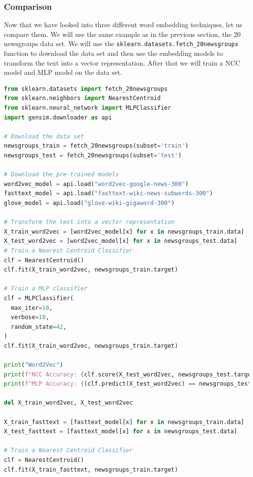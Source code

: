 \subsubsection{Comparison}
Now that we have looked into three different word embedding techniques, let us compare them.
We will use the same example as in the previous section, the 20 newsgroups data set.
We will use the \lstinline{sklearn.datasets.fetch_20newsgroups} function to download the data set and then use the embedding models to transform the text into a vector representation.
After that we will train a NCC model and MLP model on the data set.


\begin{lstlisting}[language=Python, caption={20 newsgroups example with embeddings}, label={code:20-newsgroups-embeddings}]
from sklearn.datasets import fetch_20newsgroups
from sklearn.neighbors import NearestCentroid
from sklearn.neural_network import MLPClassifier
import gensim.downloader as api

# Download the data set
newsgroups_train = fetch_20newsgroups(subset='train')
newsgroups_test = fetch_20newsgroups(subset='test')

# Download the pre-trained models
word2vec_model = api.load("word2vec-google-news-300")
fasttext_model = api.load("fasttext-wiki-news-subwords-300")
glove_model = api.load("glove-wiki-gigaword-300")

# Transform the text into a vector representation
X_train_word2vec = [word2vec_model[x] for x in newsgroups_train.data]
X_test_word2vec = [word2vec_model[x] for x in newsgroups_test.data]
# Train a Nearest Centroid Classifier
clf = NearestCentroid()
clf.fit(X_train_word2vec, newsgroups_train.target)

# Train a MLP classifier
clf = MLPClassifier(
  max_iter=10,
  verbose=10,
  random_state=42,
)
clf.fit(X_train_word2vec, newsgroups_train.target)

print("Word2Vec")
print(f"NCC Accuracy: {clf.score(X_test_word2vec, newsgroups_test.target)}")
print(f"MLP Accuracy: {(clf.predict(X_test_word2vec) == newsgroups_test.target).mean()}")

del X_train_word2vec, X_test_word2vec

X_train_fasttext = [fasttext_model[x] for x in newsgroups_train.data]
X_test_fasttext = [fasttext_model[x] for x in newsgroups_test.data]

# Train a Nearest Centroid Classifier
clf = NearestCentroid()
clf.fit(X_train_fasttext, newsgroups_train.target)


\end{lstlisting}
